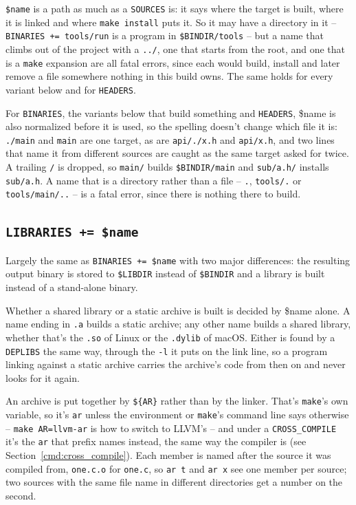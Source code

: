 \documentclass{article}
\begin{document}
\texttt{\$name} is a path as much as a \texttt{SOURCES} is: it says
where the target is built, where it is linked and where
\texttt{make install} puts it.  So it may have a directory in it --
\texttt{BINARIES += tools/run} is a program in \texttt{\$BINDIR/tools}
-- but a name that climbs out of the project with a \texttt{../}, one
that starts from the root, and one that is a \texttt{make} expansion
are all fatal errors, since each would build, install and later remove
a file somewhere nothing in this build owns.  The same holds for every
variant below and for \texttt{HEADERS}.

For \texttt{BINARIES}, the variants below that build something and
\texttt{HEADERS}, \$name is also normalized before it is used, so the
spelling doesn't change which file it is: \texttt{./main} and
\texttt{main} are one target, as are \texttt{api/./x.h} and
\texttt{api/x.h}, and two lines that name it from different sources
are caught as the same target asked for twice.  A trailing \texttt{/}
is dropped, so \texttt{main/} builds \texttt{\$BINDIR/main} and
\texttt{sub/a.h/} installs \texttt{sub/a.h}.  A name that is a
directory rather than a file -- \texttt{.}, \texttt{tools/.} or
\texttt{tools/main/..} -- is a fatal error, since there is nothing there
to build.

\subsection{\texttt{LIBRARIES += \$name} \label{cmd:libraries}}

Largely the same as \texttt{BINARIES += \$name} with two major
differences: the resulting output binary is stored to
\texttt{\$LIBDIR} instead of \texttt{\$BINDIR} and a library is built
instead of a stand-alone binary.

Whether a shared library or a static archive is built is decided by
\$name alone.  A name ending in \texttt{.a} builds a static archive;
any other name builds a shared library, whether that's the
\texttt{.so} of Linux or the \texttt{.dylib} of macOS.  Either is
found by a \texttt{DEPLIBS} the same way, through the \texttt{-l} it
puts on the link line, so a program linking against a static archive
carries the archive's code from then on and never looks for it again.

An archive is put together by \texttt{\$\{AR\}} rather than by the
linker.  That's \texttt{make}'s own variable, so it's \texttt{ar}
unless the environment or \texttt{make}'s command line says otherwise
-- \texttt{make AR=llvm-ar} is how to switch to LLVM's -- and under a
\texttt{CROSS\_COMPILE} it's the \texttt{ar} that prefix names
instead, the same way the compiler is (see
Section~\ref{cmd:cross_compile}).  Each member is named after the
source it was compiled from, \texttt{one.c.o} for \texttt{one.c}, so
\texttt{ar t} and \texttt{ar x} see one member per source; two sources
with the same file name in different directories get a number on the
second.
\end{document}
